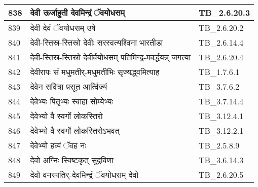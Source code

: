 \documentclass[17pt]{extarticle}
\begin{document}
\begin{longtable}{||p{0.4in}||p{4.9in}||p{0.9in}||}
    \hline
        
    838 & देवी ऊर्जाहुती देवमिन्द्रं ॅवयोधसम् & TB\_2.6.20.3       \\
    
    \hline
        
    839 & देवी देवं ॅवयोधसम् उषे & TB\_2.6.20.2       \\
    
    \hline
        
    840 & देवी{-}स्तिस्र{-}स्तिस्रो देवीः सरस्वत्यश्विना भारतीडा & TB\_2.6.14.4       \\
    
    \hline
        
    841 & देवी{-}स्तिस्र{-}स्तिस्रो देवीर्वयोधसम् पतिमिन्द्र{-}मवर्द्धयन्न् जगत्या & TB\_2.6.20.4       \\
    
    \hline
        
    842 & देवीरापः सं मधुमतीर्{-}मधुमतीभिः सृज्यद्ध्वमित्याह & TB\_1.7.6.1       \\
    
    \hline
        
    843 & देवेन सवित्रा प्रसूत आर्त्विज्यं & TB\_3.7.6.2       \\
    
    \hline
        
    844 & देवेभ्यः पितृभ्यः स्वाहा सोम्येभ्यः & TB\_3.7.14.4       \\
    
    \hline
        
    845 & देवेभ्यो वै स्वर्गो लोकस्तिरो & TB\_3.12.4.1       \\
    
    \hline
        
    846 & देवेभ्यो वै स्वर्गो लोकस्तिरोऽभवत् & TB\_3.12.2.1       \\
    
    \hline
        
    847 & देवेभ्यो हव्यं ॅवह नः & TB\_2.5.8.9       \\
    
    \hline
        
    848 & देवो अग्निः स्विष्टकृत् सुद्रविणा & TB\_3.6.14.3       \\
    
    \hline
        
    849 & देवो वनस्पतिर्{-}देवमिन्द्रं ॅवयोधसम् देवो & TB\_2.6.20.5       \\
    

\end{longtable}
\end{document}

